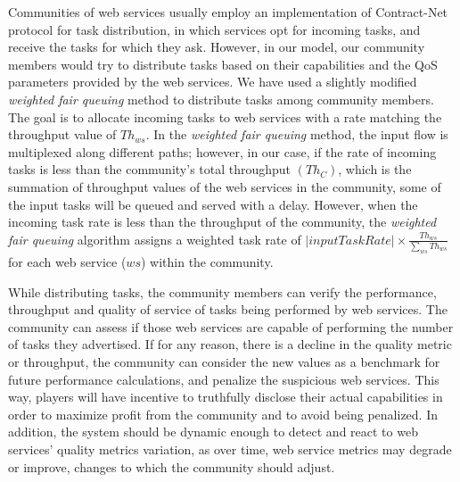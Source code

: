 Communities of web services usually employ an implementation of Contract-Net protocol for task distribution, in which services opt for incoming tasks, and receive the tasks for which they ask. However, in our model, our community members would try to distribute tasks based on their capabilities and the QoS parameters provided by the web services. We have used a slightly modified \emph{weighted fair queuing} method to distribute tasks among community members. The goal is to allocate incoming tasks to web services with a rate matching the throughput value of $Th_{ws}$. In the \emph{weighted fair queuing} method, the input flow is multiplexed along different paths; however, in our case, if the rate of incoming tasks is less than the community's total throughput $(Th_{C})$, which is the summation of throughput values of the web services in the community, some of the input tasks will be queued and served with a delay.
However, when the incoming task rate is less than the throughput of the community, the \emph{weighted fair queuing} algorithm assigns a weighted task rate of $|input Task Rate| \times \frac{Th_{ws}}{\sum_{ws}{Th_{ws}}}$ for each web service ($ws$) within the community.

While distributing tasks, the community members can verify the performance, throughput and quality of service of tasks being performed by web services. The community can assess if those web services are capable of performing the number of tasks they advertised. If for any reason, there is a decline in the quality metric or throughput, the community can consider the new values as a benchmark for future performance calculations, and penalize the suspicious web services. This way, players will have incentive to truthfully disclose their actual capabilities in order to maximize profit from the community and to avoid being penalized. In addition, the system should be dynamic enough to detect and react to web services' quality metrics variation, as over time, web service metrics may degrade or improve, changes to which the community should adjust.

